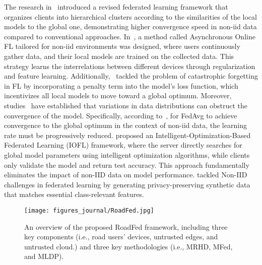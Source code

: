 The research in~\cite{briggs2020federated} introduced a revised federated learning framework that organizes clients into hierarchical clusters according to the similarities of the local models to the global one, demonstrating higher convergence speed in non-iid data compared to conventional approaches. In~\cite{chen2020asynchronous}, a method called Asynchronous Online FL tailored for non-iid environments was designed, where users continuously gather data, and their local models are trained on the collected data. This strategy learns the interrelations between different devices through regularization and feature learning. Additionally,~\cite{shoham2019overcoming} tackled the problem of catastrophic forgetting in FL by incorporating a penalty term into the model’s loss function, which incentivizes all local models to move toward a global optimum. Moreover, studies~\cite{chen2020asynchronous,li2019convergence} have established that variations in data distributions can obstruct the convergence of the model. Specifically, according to~\cite{li2019convergence}, for FedAvg to achieve convergence to the global optimum in the context of non-iid data, the learning rate must be progressively reduced.
\cite{li2024iofl} proposed an Intelligent-Optimization-Based Federated Learning (IOFL) framework, where the server directly searches for global model parameters using intelligent optimization algorithms, while clients only validate the model and return test accuracy. This approach fundamentally eliminates the impact of non-IID data on model performance. 
\cite{li2024feature} tackled Non-IID challenges in federated learning by generating privacy-preserving synthetic data that matches essential class-relevant features.


\begin{figure*}[t]
\vspace{-2mm}
\centering
\texttt{[image: figures\_journal/RoadFed.jpg]}
\caption{An overview of the proposed RoadFed framework, including three key components (i.e., road users' devices, untrusted edges, and untrusted cloud.) and three key methodologies (i.e., MRHD, MFed, and MLDP).}
\label{fi:RoadFedFramework}
\vspace{-2mm}
\end{figure*}


